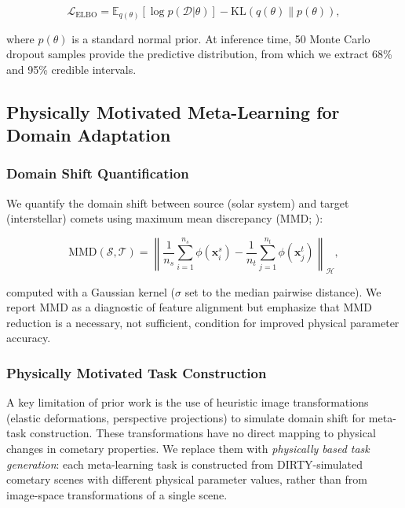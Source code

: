 \documentclass[usenatbib]{mnras}
\begin{document}
\begin{equation}\label{eq:elbo}
\mathcal{L}_{\text{ELBO}} = \mathbb{E}_{q(\theta)}[\log p(\mathcal{D}|\theta)] - \text{KL}(q(\theta) \| p(\theta)),
\end{equation}

where $p(\theta)$ is a standard normal prior. At inference time, 50 Monte Carlo dropout samples \citep{gal16} provide the predictive distribution, from which we extract 68\% and 95\% credible intervals.

\subsection{Physically Motivated Meta-Learning for Domain Adaptation}\label{sec:domain_adapt}

\subsubsection{Domain Shift Quantification}

We quantify the domain shift between source (solar system) and target (interstellar) comets using maximum mean discrepancy (MMD; \citealt{gretton12}):

\begin{equation}\label{eq:mmd}
\text{MMD}(\mathcal{S}, \mathcal{T}) = \left\| \frac{1}{n_s}\sum_{i=1}^{n_s} \phi(\mathbf{x}_i^s) - \frac{1}{n_t}\sum_{j=1}^{n_t} \phi(\mathbf{x}_j^t) \right\|_{\mathcal{H}},
\end{equation}

computed with a Gaussian kernel ($\sigma$ set to the median pairwise distance). We report MMD as a diagnostic of feature alignment but emphasize that MMD reduction is a necessary, not sufficient, condition for improved physical parameter accuracy.

\subsubsection{Physically Motivated Task Construction}

A key limitation of prior work is the use of heuristic image transformations (elastic deformations, perspective projections) to simulate domain shift for meta-task construction. These transformations have no direct mapping to physical changes in cometary properties. We replace them with \textit{physically based task generation}: each meta-learning task is constructed from DIRTY-simulated cometary scenes with different physical parameter values, rather than from image-space transformations of a single scene.
\end{document}
